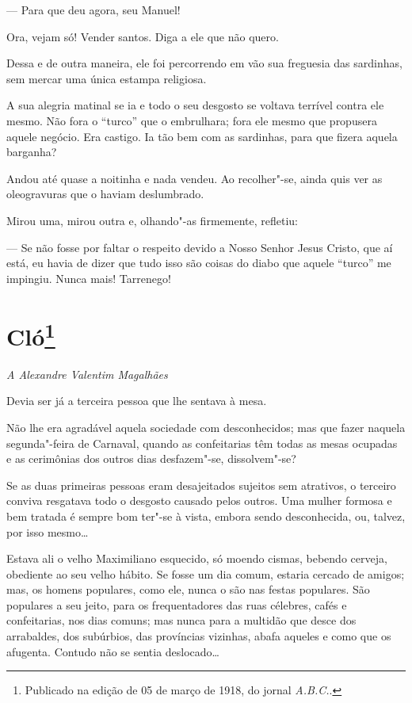 --- Para que deu agora, seu Manuel!

Ora, vejam só! Vender santos. Diga a ele que não quero.

Dessa e de outra maneira, ele foi percorrendo em vão sua freguesia das
sardinhas, sem mercar uma única estampa religiosa.

A sua alegria matinal se ia e todo o seu desgosto se voltava terrível
contra ele mesmo. Não fora o ``turco'' que o embrulhara; fora ele mesmo
que propusera aquele negócio. Era castigo. Ia tão bem com as sardinhas,
para que fizera aquela barganha?

Andou até quase a noitinha e nada vendeu. Ao recolher"-se, ainda quis ver
as oleogravuras que o haviam deslumbrado.

Mirou uma, mirou outra e, olhando"-as firmemente, refletiu:

--- Se não fosse por faltar o respeito devido a Nosso Senhor Jesus
Cristo, que aí está, eu havia de dizer que tudo isso são coisas do diabo
que aquele ``turco'' me impingiu. Nunca mais! Tarrenego!



\chapter[Cló]{Cló\footnote[*]{Publicado na edição de 05 de março de 1918, do jornal \emph{A.B.C.}.}}

\hfill\emph{A Alexandre Valentim Magalhães}\bigskip

\noindent{}Devia ser já a terceira pessoa que lhe sentava à mesa.

Não lhe era agradável aquela sociedade com desconhecidos; mas que fazer
naquela segunda"-feira de Carnaval, quando as confeitarias têm todas as
mesas ocupadas e as cerimônias dos outros dias desfazem"-se,
dissolvem"-se?

Se as duas primeiras pessoas eram desajeitados sujeitos sem atrativos, o
terceiro conviva resgatava todo o desgosto causado pelos outros. Uma
mulher formosa e bem tratada é sempre bom ter"-se à vista, embora sendo
desconhecida, ou, talvez, por isso mesmo\ldots{}

Estava ali o velho Maximiliano esquecido, só moendo cismas, bebendo
cerveja, obediente ao seu velho hábito. Se fosse um dia comum, estaria
cercado de amigos; mas, os homens populares, como ele, nunca o são nas
festas populares. São populares a seu jeito, para os frequentadores das
ruas célebres, cafés e confeitarias, nos dias comuns; mas nunca para a
multidão que desce dos arrabaldes, dos subúrbios, das províncias
vizinhas, abafa aqueles e como que os afugenta. Contudo não se sentia
deslocado\ldots{}

